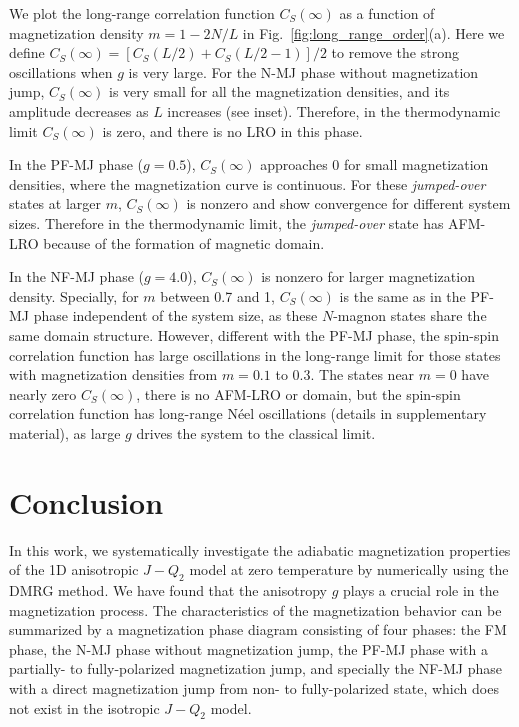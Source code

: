 \documentclass[article,10pt,onecolumn,superscriptaddress,floatfix]{revtex4}
\begin{document}
We plot the long-range correlation function $C_S(\infty)$ as a function of magnetization density $m=1-2N/L$ in Fig.~\ref{fig:long_range_order}(a). Here we define $C_S(\infty)=[C_S(L/2)+C_S(L/2-1)]/2$ to remove the strong oscillations when $g$ is very large. For the N-MJ phase without magnetization jump, $C_S(\infty)$ is very small for all the magnetization densities, and its amplitude decreases as $L$ increases (see inset). Therefore, in the thermodynamic limit $C_S(\infty)$ is zero, and there is no LRO in this phase.

In the PF-MJ phase ($g=0.5$), $C_S(\infty)$ approaches 0 for small magnetization densities, where the magnetization curve is continuous. For these \textit{jumped-over} states at larger $m$, $C_S(\infty)$ is nonzero and show convergence for different system sizes. Therefore in the thermodynamic limit, the \textit{jumped-over} state has AFM-LRO because of the formation of magnetic domain.

In the NF-MJ phase ($g=4.0$), $C_S(\infty)$ is nonzero for larger magnetization density. Specially, for $m$ between 0.7 and 1, $C_S(\infty)$ is the same as in the PF-MJ phase independent of the system size, as these $N$-magnon states share the same domain structure. However, different with the PF-MJ phase, the spin-spin correlation function has large oscillations in the long-range limit for those states with magnetization densities from $m = 0.1$ to $0.3$.
The states near $m=0$ have nearly zero $C_S(\infty)$, there is no AFM-LRO or domain, but the spin-spin correlation function has long-range N\'eel oscillations (details in supplementary material), as large $g$ drives the system to the classical limit.


\section{Conclusion}
\label{sec_5}

In this work, we systematically investigate the adiabatic magnetization properties of the 1D anisotropic $J-Q_{2}$ model at zero temperature by numerically using the DMRG method.
We have found that the anisotropy $g$ plays a crucial role in the magnetization process. The characteristics of the magnetization behavior can be summarized by a magnetization phase diagram consisting of four phases: the FM phase, the N-MJ phase without magnetization jump, the PF-MJ phase with a partially- to fully-polarized magnetization jump, and specially the NF-MJ phase with a direct magnetization jump from non- to fully-polarized state, which does not exist in the isotropic $J-Q_{2}$ model.
\end{document}
